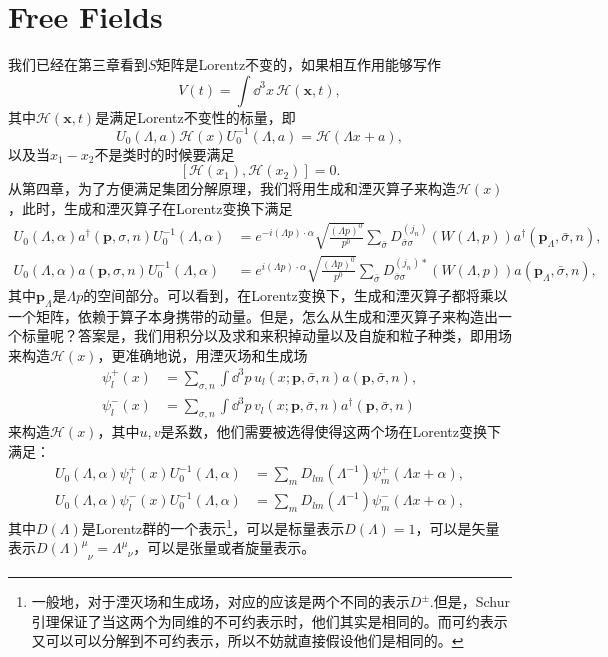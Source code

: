 \documentclass[9pt]{extbook}
\theoremstyle{plain}%
\begin{document}
\section{Free Fields}
我们已经在第三章看到$S$矩阵是Lorentz不变的，如果相互作用能够写作
\[
	V(t)=\int \dd^3 x\,\mathscr{H}(\mathbf{x},t),
\]
其中$\mathscr{H}(\mathbf{x},t)$是满足Lorentz不变性的标量，即
\[
	U_0(\Lambda,a)\mathscr{H}(x)U_0^{-1}(\Lambda,a)=\mathscr{H}(\Lambda x+a),
\]
以及当$x_1-x_2$不是类时的时候要满足
\[
	[\mathscr{H}(x_1),\mathscr{H}(x_2)]=0.
\]
从第四章，为了方便满足集团分解原理，我们将用生成和湮灭算子来构造$\mathscr{H}(x)$，此时，生成和湮灭算子在Lorentz变换下满足
\[
\begin{split}
	U_0(\Lambda,\alpha)a^\dag(\mathbf{p},\sigma,n)U_0^{-1}(\Lambda,\alpha)&=e^{-i(\Lambda p)\cdot \alpha}\sqrt{\frac{(\Lambda p)^0}{p^0}}\sum_{\bar{\sigma}} D^{(j_n)}_{\bar{\sigma}\sigma}\left(W(\Lambda,p)\right)a^\dag(\mathbf{p}_\Lambda,\bar{\sigma},n),\\
	U_0(\Lambda,\alpha)a(\mathbf{p},\sigma,n)U_0^{-1}(\Lambda,\alpha)&=e^{i(\Lambda p)\cdot \alpha}\sqrt{\frac{(\Lambda p)^0}{p^0}}\sum_{\bar{\sigma}} D^{(j_n)*}_{\bar{\sigma}\sigma}\left(W(\Lambda,p)\right)a(\mathbf{p}_\Lambda,\bar{\sigma},n),
\end{split}
\]
其中$\mathbf{p}_\Lambda$是$\Lambda p$的空间部分。可以看到，在Lorentz变换下，生成和湮灭算子都将乘以一个矩阵，依赖于算子本身携带的动量。但是，怎么从生成和湮灭算子来构造出一个标量呢？答案是，我们用积分以及求和来积掉动量以及自旋和粒子种类，即用场来构造$\mathscr{H}(x)$，更准确地说，用湮灭场和生成场
\begin{equation}
\begin{split}
	\psi_l^{+}(x)&=\sum_{\sigma,n}\int \dd^3 p\, u_l(x;\mathbf{p},\bar{\sigma},n)a(\mathbf{p},\bar{\sigma},n),\\
	\psi_l^{-}(x)&=\sum_{\sigma,n}\int \dd^3 p\, v_l(x;\mathbf{p},\bar{\sigma},n)a^\dag(\mathbf{p},\bar{\sigma},n)
\end{split}
\label{chang}
\end{equation}
来构造$\mathscr{H}(x)$，其中$u,v$是系数，他们需要被选得使得这两个场在Lorentz变换下满足：
\[
\begin{split}
	U_0(\Lambda,\alpha)\psi_l^{+}(x)U_0^{-1}(\Lambda,\alpha)&=\sum_{m}D_{lm}(\Lambda^{-1})\psi_m^{+}(\Lambda x+\alpha),\\
	U_0(\Lambda,\alpha)\psi_l^{-}(x)U_0^{-1}(\Lambda,\alpha)&=\sum_{m}D_{lm}(\Lambda^{-1})\psi_m^{-}(\Lambda x+\alpha),
\end{split}
\]
其中$D(\Lambda)$是Lorentz群的一个表示\footnote{一般地，对于湮灭场和生成场，对应的应该是两个不同的表示$D^\pm$.但是，Schur引理保证了当这两个为同维的不可约表示时，他们其实是相同的。而可约表示又可以可以分解到不可约表示，所以不妨就直接假设他们是相同的。}，可以是标量表示$D(\Lambda)=1$，可以是矢量表示$D(\Lambda)^{\mu}_{\phantom{\mu}\nu}=\Lambda^{\mu}_{\phantom{\mu}\nu}$，可以是张量或者旋量表示。
\end{document}
